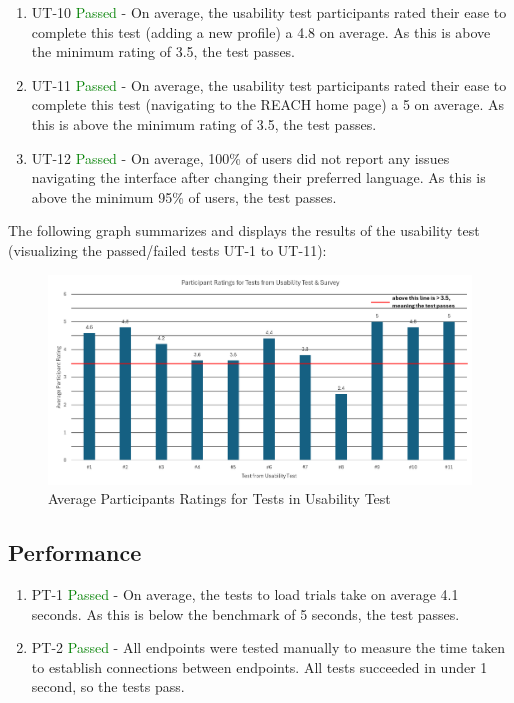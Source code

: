 \documentclass[12pt, titlepage]{article}
\begin{document}
\begin{enumerate}
  \item UT-10 \textcolor{green}{Passed} - On average, the usability test participants rated their ease to complete this test (adding a new profile) a 4.8 on average. As this is above the minimum rating of 3.5, the test passes.
  \item UT-11 \textcolor{green}{Passed} - On average, the usability test participants rated their ease to complete this test (navigating to the REACH home page) a 5 on average. As this is above the minimum rating of 3.5, the test passes.
  \item UT-12 \textcolor{green}{Passed} - On average, 100\% of users did not report any issues navigating the interface after changing their preferred language. As this is above the minimum 95\% of users, the test passes.
\end{enumerate}

\noindent The following graph summarizes and displays the results of the usability test (visualizing the passed/failed tests UT-1 to UT-11):

\begin{figure}[H]
  \centering
  \includegraphics[width=1\linewidth]{images/AverageRatingsUT.png}
  \caption{Average Participants Ratings for Tests in Usability Test}
  \label{fig:figure1}
\end{figure}
		
\subsection{Performance}
\begin{enumerate}
  \item PT-1 \textcolor{green}{Passed} - On average, the tests to load trials take on average 4.1 seconds. As this is below the benchmark of 5 seconds, the test passes.
\item PT-2 \textcolor{green}{Passed} - All endpoints were tested manually to measure the time taken to establish connections between endpoints. All tests succeeded in under 1 second, so the tests pass.
\end{enumerate}
\end{document}
